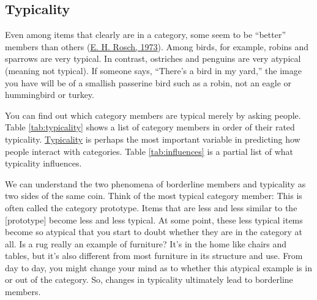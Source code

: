\documentclass[
]{krantz}
\begin{document}
\hypertarget{typicality}{%
\subsection*{Typicality}\label{typicality}}


Even among items that clearly are in a category, some seem to be ``better'' members than others (\protect\hyperlink{ref-Rosch1973}{E. H. Rosch, 1973}). Among birds, for example, robins and sparrows are very typical. In contrast, ostriches and penguins are very atypical (meaning not typical). If someone says, ``There's a bird in my yard,'' the image you have will be of a smallish passerine bird such as a robin, not an eagle or hummingbird or turkey.

You can find out which category members are typical merely by asking people. Table \ref{tab:typicality} shows a list of category members in order of their rated typicality. \protect\hyperlink{typicality}{Typicality} is perhaps the most important variable in predicting how people interact with categories. Table \ref{tab:influences} is a partial list of what typicality influences.

We can understand the two phenomena of borderline members and typicality as two sides of the same coin. Think of the most typical category member: This is often called the category prototype. Items that are less and less similar to the {[}prototype{]} become less and less typical. At some point, these less typical items become so atypical that you start to doubt whether they are in the category at all. Is a rug really an example of furniture? It's in the home like chairs and tables, but it's also different from most furniture in its structure and use. From day to day, you might change your mind as to whether this atypical example is in or out of the category. So, changes in typicality ultimately lead to borderline members.
\end{document}
